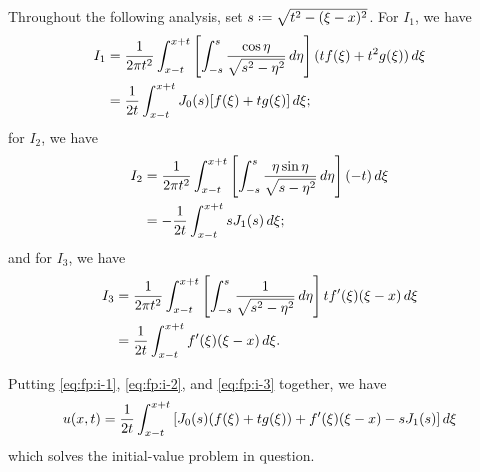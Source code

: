 \begin{solution*}
  Throughout the following analysis, set \(s\defeq\sqrt{t^2-(\xi-x)^2}\).
  For \(I_1\), we have
  \begin{equation}
    \label{eq:fp:i-1}
    \begin{aligned}
      I_1 &=\frac{1}{2\pi t^2}\int_{x-t}^{x+t}%
      \left[%
        \int_{-s}^s\frac{\cos\eta}{\sqrt{s^2-\eta^2}}\diff\eta%
      \right]%
      (tf(\xi)+t^2g(\xi))\diff\xi\\
      &=\frac{1}{2t}\int_{x-t}^{x+t} J_0(s)[f(\xi)+tg(\xi)]\diff\xi;
    \end{aligned}
  \end{equation}
  for \(I_2\), we have
  \begin{equation}
    \label{eq:fp:i-2}
    \begin{aligned}
      I_2 &=\frac{1}{2\pi t^2}%
      \int_{x-t}^{x+t}%
      \left[%
        \int_{-s}^s\frac{\eta\sin\eta}{\sqrt{s-\eta^2}}\diff\eta%
      \right](-t)\diff\xi\\
      &=-\frac{1}{2t}\int_{x-t}^{x+t} sJ_1(s)\diff\xi;
    \end{aligned}
  \end{equation}
  and for \(I_3\), we have
  \begin{equation}
    \label{eq:fp:i-3}
    \begin{aligned}
      I_3 &=\frac{1}{2\pi t^2}%
      \int_{x-t}^{x+t}%
      \left[%
        \int_{-s}^s%
        \frac{1}{\sqrt{s^2-\eta^2}}%
        \diff\eta\right] tf'(\xi)(\xi-x)\diff\xi\\
      &=\frac{1}{2t}\int_{x-t}^{x+t} f'(\xi)(\xi-x)\diff\xi.
    \end{aligned}
  \end{equation}

  Putting \eqref{eq:fp:i-1}, \eqref{eq:fp:i-2}, and \eqref{eq:fp:i-3}
  together, we have
  \[
    u(x,t)=\frac{1}{2t}\int_{x-t}^{x+t}
    \left[
      J_0(s)(f(\xi)+tg(\xi))
      +
      f'(\xi)(\xi-x)
      -sJ_1(s)
    \right]\mathop{}\!d\xi
  \]
  which solves the initial-value problem in question.
\end{solution*}

